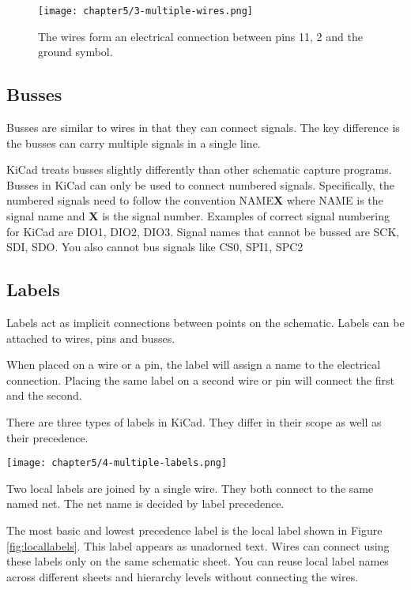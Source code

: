 \begin{figure}
	\texttt{[image: chapter5/3-multiple-wires.png]}
	\caption[fig:multiple-wires]{The wires form an electrical connection between pins 11, 2 and the ground symbol.}
\end{figure}

\subsection{Busses}

Busses are similar to wires in that they can connect signals.
The key difference is the busses can carry multiple signals in a single line.

KiCad treats busses slightly differently than other schematic capture programs.
Busses in KiCad can only be used to connect numbered signals.
Specifically, the numbered signals need to follow the convention \textsc{NAME}\textbf{X} where \textsc{NAME} is the signal name and \textbf{X} is the signal number.
Examples of correct signal numbering for KiCad are \textsc{DIO1}, \textsc{DIO2}, \textsc{DIO3}.
Signal names that cannot be bussed are \textsc{SCK}, \textsc{SDI}, \textsc{SDO}.
You also cannot bus signals like \textsc{CS0}, \textsc{SPI1}, \textsc{SPC2}

\subsection{Labels}

Labels act as implicit connections between points on the schematic.  
Labels can be attached to wires, pins and busses.

When placed on a wire or a pin, the label will assign a name to the electrical connection.
Placing the same label on a second wire or pin will connect the first and the second.

There are three types of labels in KiCad.
They differ in their scope as well as their precedence.

\begin{marginfigure}
	\texttt{[image: chapter5/4-multiple-labels.png]}
	\caption[Local Labels]{
		Two local labels are joined by a single wire.  
		They both connect to the same named net.
		The net name is decided by label precedence.
	}
	\label{fig:locallabels}
\end{marginfigure}
The most basic and lowest precedence label is the local label shown in Figure \ref{fig:locallabels}.
This label appears as unadorned text.
Wires can connect using these labels only on the same schematic sheet.
You can reuse local label names across different sheets and hierarchy levels without connecting the wires.

